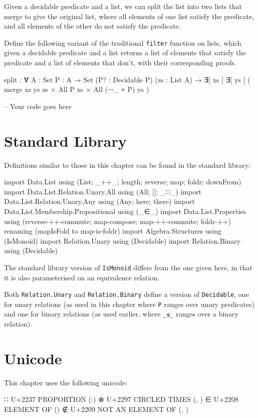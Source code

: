Given a decidable predicate and a list, we can split the list into two
lists that merge to give the original list, where all elements of one
list satisfy the predicate, and all elements of the other do not satisfy
the predicate.

Define the following variant of the traditional \texttt{filter} function
on lists, which given a decidable predicate and a list returns a list of
elements that satisfy the predicate and a list of elements that don't,
with their corresponding proofs.

\begin{myDisplay}
split : ∀ {A : Set} {P : A → Set} (P? : Decidable P) (zs : List A)
  → ∃[ xs ] ∃[ ys ] ( merge xs ys zs × All P xs × All (¬_ ∘ P) ys )
\end{myDisplay}

\begin{fence}
\begin{code}
-- Your code goes here
\end{code}
\end{fence}

\hypertarget{standard-library}{%
\section{Standard Library}\label{standard-library}}

Definitions similar to those in this chapter can be found in the
standard library:

\begin{fence}
\begin{code}
import Data.List using (List; _++_; length; reverse; map; foldr; downFrom)
import Data.List.Relation.Unary.All using (All; []; _∷_)
import Data.List.Relation.Unary.Any using (Any; here; there)
import Data.List.Membership.Propositional using (_∈_)
import Data.List.Properties
  using (reverse-++-commute; map-compose; map-++-commute; foldr-++)
  renaming (mapIsFold to map-is-foldr)
import Algebra.Structures using (IsMonoid)
import Relation.Unary using (Decidable)
import Relation.Binary using (Decidable)
\end{code}
\end{fence}

The standard library version of \texttt{IsMonoid} differs from the one
given here, in that it is also parameterised on an equivalence relation.

Both \texttt{Relation.Unary} and \texttt{Relation.Binary} define a
version of \texttt{Decidable}, one for unary relations (as used in this
chapter where \texttt{P} ranges over unary predicates) and one for
binary relations (as used earlier, where \texttt{\_≤\_} ranges over a
binary relation).

\hypertarget{unicode}{%
\section{Unicode}\label{unicode}}

This chapter uses the following unicode:

\begin{myDisplay}
∷  U+2237  PROPORTION  (\::)
⊗  U+2297  CIRCLED TIMES  (\otimes, \ox)
∈  U+2208  ELEMENT OF  (\in)
∉  U+2209  NOT AN ELEMENT OF  (\inn, \notin)
\end{myDisplay}


